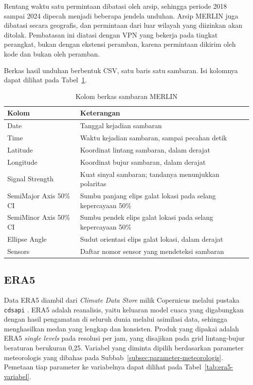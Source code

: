 Rentang waktu satu permintaan dibatasi oleh arsip, sehingga periode 2018 sampai 2024 dipecah menjadi beberapa jendela unduhan.
Arsip MERLIN juga dibatasi secara geografis, dan permintaan dari luar wilayah yang diizinkan akan ditolak.
Pembatasan ini diatasi dengan VPN yang bekerja pada tingkat perangkat, bukan dengan ekstensi peramban, karena permintaan dikirim oleh kode dan bukan oleh peramban.

Berkas hasil unduhan berbentuk CSV, satu baris satu sambaran.
Isi kolomnya dapat dilihat pada Tabel~\ref{tab:kolom-merlin}.

\begin{table}[!t]
  \caption{Kolom berkas sambaran MERLIN}
  \label{tab:kolom-merlin}
  \footnotesize
  \begin{tabular}{ | l | p{} | }
    \hline
    Kolom & Keterangan \\
    \hline
    Date & Tanggal kejadian sambaran \\
    Time & Waktu kejadian sambaran, sampai pecahan detik \\
    Latitude & Koordinat lintang sambaran, dalam derajat \\
    Longitude & Koordinat bujur sambaran, dalam derajat \\
    Signal Strength & Kuat sinyal sambaran; tandanya menunjukkan polaritas \\
    SemiMajor Axis 50\% CI & Sumbu panjang elips galat lokasi pada selang kepercayaan 50\% \\
    SemiMinor Axis 50\% CI & Sumbu pendek elips galat lokasi pada selang kepercayaan 50\% \\
    Ellipse Angle & Sudut orientasi elips galat lokasi, dalam derajat \\
    Sensors & Daftar nomor sensor yang mendeteksi sambaran \\
    \hline
  \end{tabular}
\end{table}

\subsection{ERA5}
\label{subsec:era5}
Data ERA5 diambil dari \textit{Climate Data Store} milik Copernicus melalui pustaka \texttt{cdsapi} \autocite{c3s2023era5}.
ERA5 adalah reanalisis, yaitu keluaran model cuaca yang digabungkan dengan hasil pengamatan di seluruh dunia melalui asimilasi data, sehingga menghasilkan medan yang lengkap dan konsisten.
Produk yang dipakai adalah ERA5 \textit{single levels} pada resolusi per jam, yang disajikan pada grid lintang-bujur beraturan berukuran 0,25\textdegree.
Variabel yang diminta dipilih berdasarkan parameter meteorologis yang dibahas pada Subbab~\ref{subsec:parameter-meteorologis}.
Pemetaan tiap parameter ke variabelnya dapat dilihat pada Tabel~\ref{tab:era5-variabel}.

